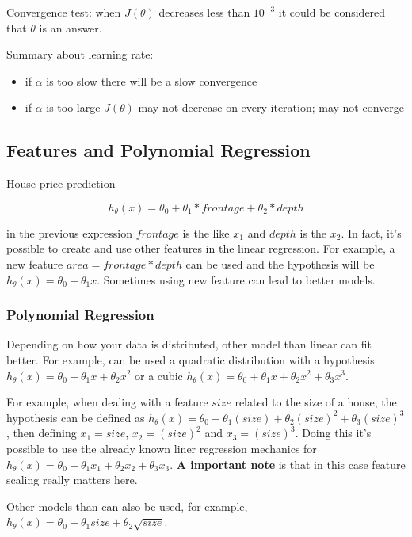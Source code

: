 \documentclass[a4paper]{article}
\begin{document}
Convergence test: when $J(\theta)$ decreases less than $10^{-3}$ it could be considered that $\theta$ is an answer.

Summary about learning rate:

\begin{itemize}
\item if $\alpha$ is too slow there will be a slow convergence
\item if $\alpha$ is too large $J(\theta)$ may not decrease on every iteration; may not converge
\end{itemize}

\subsection{Features and Polynomial Regression}

House price prediction

\[h_\theta(x) = \theta_0 + \theta_1 * frontage + \theta_2 * depth \]

in the previous expression $frontage$ is the like $x_1$ and $depth$ is the $x_2$. In fact, it's possible to create and use other features in the linear regression. For example, a new feature $area = frontage * depth$ can be used and the hypothesis will be $h_\theta(x) = \theta_0 + \theta_1 x$. Sometimes using new feature can lead to better models.

\subsubsection{Polynomial Regression}

Depending on how your data is distributed, other model than linear can fit better. For example, can be used a quadratic distribution with a hypothesis $h_\theta(x) = \theta_0 + \theta_1 x + \theta_2 x^2$ or a cubic $h_\theta(x) = \theta_0 + \theta_1 x + \theta_2 x^2 + \theta_3 x^3$.

For example, when dealing with a feature $size$ related to the size of a house, the hypothesis can be defined as $h_\theta(x) = \theta_0 + \theta_1 (size) + \theta_2 (size)^2 + \theta_3 (size)^3$, then defining $x_1 = size$, $x_2 = (size)^2$ and $x_3 = (size)^3$. Doing this it's possible to use the already known liner regression mechanics for $h_\theta(x) = \theta_0 + \theta_1 x_1 + \theta_2 x_2 + \theta_3 x_3$. \textbf{A important note} is that in this case feature scaling really matters here.

Other models than can also be used, for example, $h_\theta(x) = \theta_0 + \theta_1 size + \theta_2 \sqrt{size}$.
\end{document}
